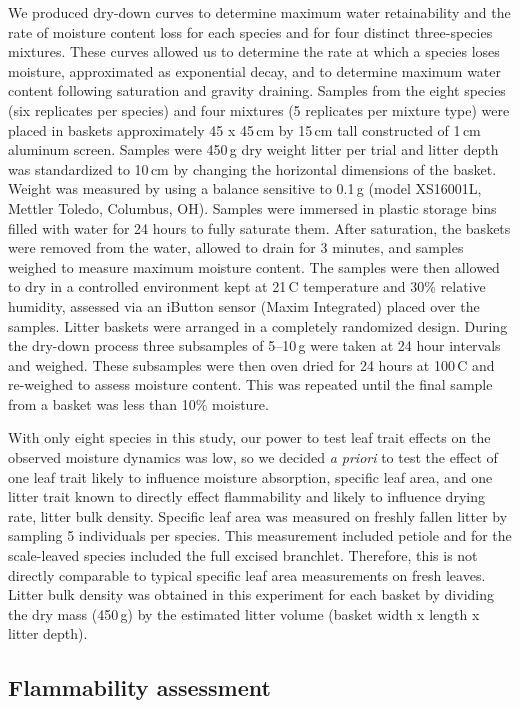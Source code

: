 \documentclass[letterpaper,12pt]{article}
\begin{document}
We produced dry-down curves to determine maximum water retainability and the
rate of moisture content loss for each species and for four distinct
three-species mixtures. These curves allowed us to determine the rate at which
a species loses moisture, approximated as exponential decay, and to determine
maximum water content following saturation and gravity draining. Samples from
the eight species (six replicates per species) and four mixtures (5 replicates
per mixture type) were placed in baskets approximately 45 x 45\,cm by 15\,cm
tall constructed of 1\,cm aluminum screen. Samples were 450\,g dry weight
litter per trial and litter depth was standardized to 10\,cm by changing the
horizontal dimensions of the basket. Weight was measured by using a balance
sensitive to 0.1\,g (model XS16001L, Mettler Toledo, Columbus, OH). Samples
were immersed in plastic storage bins filled with water for 24 hours to fully
saturate them. After saturation, the baskets were removed from the water,
allowed to drain for 3 minutes, and samples weighed to measure maximum moisture
content. The samples were then allowed to dry in a controlled environment kept
at 21\,C temperature and 30\% relative humidity, assessed via an iButton sensor
(Maxim Integrated) placed over the samples. Litter baskets were arranged in a
completely randomized design. During the dry-down process three subsamples of
5--10\,g were taken at 24 hour intervals and weighed. These subsamples were
then oven dried for 24 hours at 100\,C and re-weighed to assess moisture
content. This was repeated until the final sample from a basket was less than
10\% moisture.

With only eight species in this study, our power to test leaf trait effects on
the observed moisture dynamics was low, so we decided \emph{a priori} to test
the effect of one leaf trait likely to influence moisture absorption, specific
leaf area, and one litter trait known to directly effect flammability and
likely to influence drying rate, litter bulk density. Specific leaf area was
measured on freshly fallen litter by sampling 5 individuals per species. This
measurement included petiole and for the scale-leaved species included the full
excised branchlet. Therefore, this is not directly comparable to typical specific leaf
area measurements on fresh leaves. Litter bulk density was obtained in this
experiment for each basket by dividing the dry mass (450\,g) by the estimated
litter volume (basket width x length x litter depth).

\subsection*{Flammability assessment}
\end{document}
